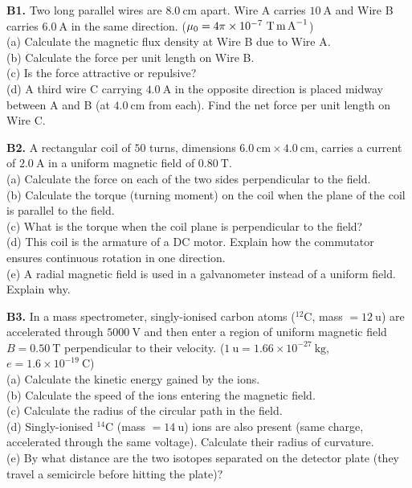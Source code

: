 \begin{exercisebox}[25]
\textbf{B1.} Two long parallel wires are
$8.0\ \text{cm}$ apart. Wire A carries
$10\ \text{A}$ and Wire B carries $6.0\ \text{A}$
in the same direction.
($\mu_0 = 4\pi\times10^{-7}\ \text{T\,m\,A}^{-1}$)\\[4pt]
(a) Calculate the magnetic flux density at Wire B
due to Wire A.\\
(b) Calculate the force per unit length on Wire B.\\
(c) Is the force attractive or repulsive?\\
(d) A third wire C carrying $4.0\ \text{A}$ in the
opposite direction is placed midway between A and B
(at $4.0\ \text{cm}$ from each). Find the net force
per unit length on Wire C.
\hfill{}

\vspace{0.4cm}

\textbf{B2.} A rectangular coil of $50$ turns,
dimensions $6.0\ \text{cm} \times 4.0\ \text{cm}$,
carries a current of $2.0\ \text{A}$ in a uniform
magnetic field of $0.80\ \text{T}$.\\[4pt]
(a) Calculate the force on each of the two sides
perpendicular to the field.\\
(b) Calculate the torque (turning moment) on the
coil when the plane of the coil is parallel to the
field.\\
(c) What is the torque when the coil plane is
perpendicular to the field?\\
(d) This coil is the armature of a DC motor. Explain
how the commutator ensures continuous rotation in
one direction.\\
(e) A radial magnetic field is used in a galvanometer
instead of a uniform field. Explain why.
\hfill{}

\vspace{0.4cm}

\textbf{B3.} In a mass spectrometer, singly-ionised
carbon atoms ($^{12}$C, mass $= 12\ \text{u}$) are
accelerated through $5000\ \text{V}$ and then enter
a region of uniform magnetic field $B = 0.50\ \text{T}$
perpendicular to their velocity.
($1\ \text{u} = 1.66\times10^{-27}\ \text{kg}$,
$e = 1.6\times10^{-19}\ \text{C}$)\\[4pt]
(a) Calculate the kinetic energy gained by the ions.\\
(b) Calculate the speed of the ions entering the
magnetic field.\\
(c) Calculate the radius of the circular path in
the field.\\
(d) Singly-ionised $^{14}$C (mass $= 14\ \text{u}$)
ions are also present (same charge, accelerated through
the same voltage). Calculate their radius of curvature.\\
(e) By what distance are the two isotopes separated
on the detector plate (they travel a semicircle before
hitting the plate)?
\hfill{}


\end{exercisebox}
